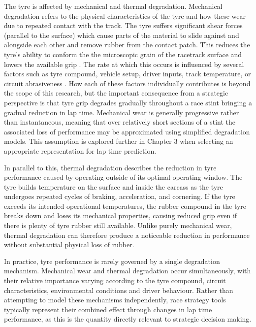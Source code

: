 The tyre is affected by mechanical and thermal degradation. Mechanical degradation refers to the physical characteristics of the tyre and how these wear due to repeated contact with the track. The tyre suffers significant shear forces (parallel to the surface) which cause parts of the material to slide against and alongside each other and remove rubber from the contact patch. This reduces the tyre's ability to conform the the microscopic grain of the racetrack surface and lowers the available grip \cite{Taylor2020FrictionRacingTyres}. The rate at which this occurs is influenced by several factors such as tyre compound, vehicle setup, driver inputs, track temperature, or circuit abrasiveness \cite{RacecarEngineering2020TyreGrip}. How each of these factors individually contributes is beyond the scope of this research, but the important consequence from a strategic perspective is that tyre grip degrades gradually throughout a race stint bringing a gradual reduction in lap time. Mechanical wear is generally progressive rather than instantaneous, meaning that over relatively short sections of a stint the associated loss of performance may be approximated using simplified degradation models. This assumption is explored further in Chapter 3 when selecting an appropriate representation for lap time prediction.

In parallel to this, thermal degradation describes the reduction in tyre performance caused by operating outside of its optimal operating window. The tyre builds temperature on the surface and inside the carcass as the tyre undergoes repeated cycles of braking, acceleration, and cornering. If the tyre exceeds its intended operational temperatures, the rubber compound in the tyre breaks down and loses its mechanical properties, causing reduced grip even if there is plenty of tyre rubber still available. Unlike purely mechanical wear, thermal degradation can therefore produce a noticeable reduction in performance without substantial physical loss of rubber.

In practice, tyre performance is rarely governed by a single degradation mechanism. Mechanical wear and thermal degradation occur simultaneously, with their relative importance varying according to the tyre compound, circuit characteristics, environmental conditions and driver behaviour. Rather than attempting to model these mechanisms independently, race strategy tools typically represent their combined effect through changes in lap time performance, as this is the quantity directly relevant to strategic decision making.

